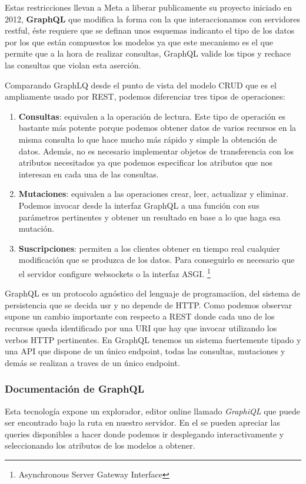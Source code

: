 Estas restricciones llevan a Meta a liberar publicamente su proyecto iniciado en 2012,
\textbf{GraphQL} que modifica la forma con la que interaccionamos con servidores restful,
éste requiere que se definan unos esquemas indicanto el tipo de los datos por los que
están compuestos los modelos ya que este mecanismo es el que permite que a la hora de
realizar consultas, GraphQL valide los tipos y rechace las consultas que violan esta
aserción.

Comparando GraphLQ desde el punto de vista del modelo CRUD que es el ampliamente usado por
REST, podemos diferenciar tres tipos de operaciones:
\begin{enumerate}
    \item \textbf{Consultas}: equivalen a la operación de lectura. Este tipo de operación
    es bastante más potente porque podemos obtener datos de varios recursos en la misma
    consulta lo que hace mucho más rápido y simple la obtención de datos. Además, no es
    necesario implementar objetos de transferencia con los atributos necesitados ya que
    podemos especificar los atributos que nos interesan en cada una de las consultas.
    \item \textbf{Mutaciones}: equivalen a las operaciones crear, leer, actualizar y
    eliminar. Podemos invocar desde la interfaz GraphQL a una función con sus parámetros
    pertinentes y obtener un resultado en base a lo que haga esa mutación.
    \item \textbf{Suscripciones}: permiten a los clientes obtener en tiempo real cualquier
    modificación que se produzca de los datos. Para conseguirlo es necesario que el
    servidor configure websockets o la interfaz ASGI. \footnote{Asynchronous Server
    Gateway Interface}
\end{enumerate}

GraphQL es un protocolo agnóstico del lenguaje de programaciíon, del sistema de
persistencia que se decida usr y no depende de HTTP. Como podemos observar supone un
cambio importante con respecto a REST donde cada uno de los recursos queda identificado
por una URI que hay que invocar utilizando los verbos HTTP pertinentes. En GraphQL tenemos
un sistema fuertemente tipado y una API que dispone de un único endpoint, todas las
consultas, mutaciones y demás se realizan a traves de un único endpoint.

\subsubsection{Documentación de GraphQL}
Esta tecnología expone un explorador, editor online llamado \textit{GraphiQL} que puede
ser encontrado bajo la ruta  en nuestro servidor. En el se pueden
apreciar las queries disponibles a hacer donde podemos ir desplegando interactivamente y
seleccionando los atributos de los modelos a obtener.

